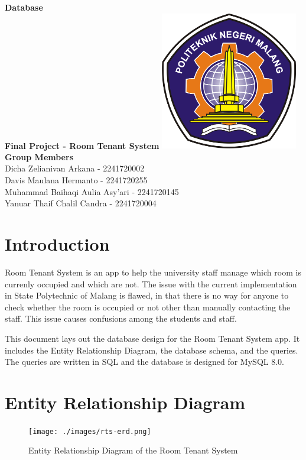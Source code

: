 \documentclass[12pt,titlepage]{article}
\newcommand{\vSubject}{Database}
\newcommand{\vSubtitle}{Final Project - Room Tenant System}
\begin{document}
\begin{titlepage}
    \centering
    \vfill
    {\bfseries\LARGE
        \vSubject\\
        \vskip0.25cm
        \vSubtitle
    }
    \vfill
    \includegraphics[width=6cm]{images/polinema-logo.png}
    \vfill
    {
        \textbf{Group Members}\\
        Dicha Zelianivan Arkana - 2241720002\\
        Davis Maulana Hermanto - 2241720255\\
        Muhammad Baihaqi Aulia Asy'ari - 2241720145\\
        Yanuar Thaif Chalil Candra - 2241720004\\
    }
\end{titlepage}

\tableofcontents

\pagebreak

\section{Introduction}
Room Tenant System is an app to help the university staff manage which room is currenly occupied and which are not.
The issue with the current implementation in State Polytechnic of Malang is flawed, in that there is no way for anyone
to check whether the room is occupied or not other than manually contacting the staff. This issue causes confusions among
the students and staff.

This document lays out the database design for the Room Tenant System app. It includes the Entity Relationship Diagram, the
database schema, and the queries. The queries are written in SQL and the database is designed for MySQL 8.0.

\pagebreak

\section{Entity Relationship Diagram}
\begin{figure}[h]
    \centering
    \texttt{[image: ./images/rts-erd.png]}
    \caption{Entity Relationship Diagram of the Room Tenant System}
\end{figure}
\end{document}
